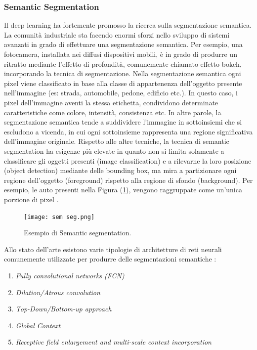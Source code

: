 \subsubsection{Semantic Segmentation}
Il deep learning ha fortemente promosso la ricerca sulla segmentazione 
semantica. La comunità industriale sta facendo enormi sforzi nello sviluppo 
di sistemi avanzati in grado di effettuare una segmentazione semantica. 
Per esempio, una fotocamera, installata nei diffusi dispositivi mobili, è in 
grado di produrre un ritratto mediante l'effetto di profondità, comunemente 
chiamato effetto bokeh, incorporando la tecnica di segmentazione. Nella 
segmentazione semantica ogni pixel viene classificato in base alla classe 
di appartenenza dell'oggetto presente nell'immagine (es: strada, automobile, 
pedone, edificio etc.). In questo caso, i pixel dell'immagine aventi 
la stessa etichetta, condividono determinate caratteristiche come colore, 
intensità, consistenza etc. In altre parole, la segmentazione semantica tende 
a suddividere l'immagine in sottoinsiemi che si escludono a vicenda, in 
cui ogni sottoinsieme rappresenta una regione significativa dell'immagine 
originale. Rispetto alle altre tecniche, la tecnica di semantic segmentation 
ha esigenze più elevate in quanto non si limita solamente a classificare gli 
oggetti presenti (image classification) e a rilevarne la loro posizione (object 
detection) mediante delle bounding box, ma mira a partizionare ogni regione 
dell'oggetto (foreground) rispetto alla regione di sfondo (background). Per 
esempio, le auto presenti nella Figura (\ref{semantic segmentation}), vengono raggruppate come 
un'unica porzione di pixel \cite{aurelien}.
\begin{figure}
    \centering
    \texttt{[image: sem seg.png]}
    \centering
    \caption{Esempio di Semantic segmentation.}
    \label{semantic segmentation}
\end{figure}
Allo stato dell'arte esistono varie tipologie 
di architetture di reti neurali comunemente utilizzate per produrre delle 
segmentazioni semantiche \cite{semantic_segmentation_networks}:
\begin{enumerate}
    \item \emph{Fully convolutional networks (FCN)}
    \item \emph{Dilation/Atrous convolution}
    \item \emph{Top-Down/Bottom-up approach}
    \item \emph{Global Context}
    \item \emph{Receptive field enlargement and multi-scale context incorporation}
\end{enumerate}

